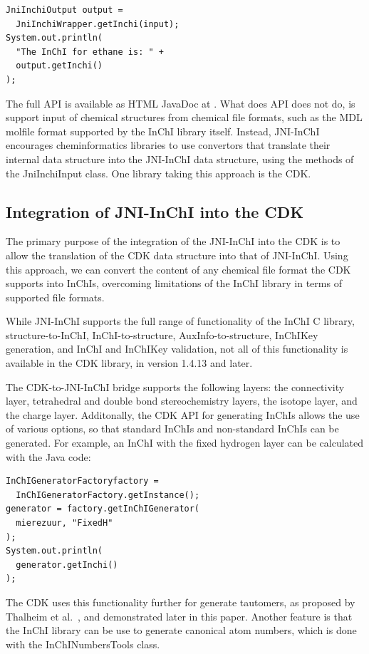 \documentclass[10pt]{bmc_article}
\newenvironment{bmcformat}{\fussy\setboolean{publ}{true}}{\fussy}
\begin{document}
\begin{bmcformat}
\begin{verbatim}
JniInchiOutput output =
  JniInchiWrapper.getInchi(input);
System.out.println(
  "The InChI for ethane is: " +
  output.getInchi()
);
\end{verbatim}

The full API is available as HTML JavaDoc at \url{}. What does API does not do, is support input of chemical
structures from chemical file formats, such as the MDL molfile format supported by the InChI library itself.
Instead, JNI-InChI encourages cheminformatics libraries to use convertors that translate their internal
data structure into the JNI-InChI data structure, using the methods of the JniInchiInput class.
One library taking this approach is the CDK.

\subsection*{Integration of JNI-InChI into the CDK}

The primary purpose of the integration of the JNI-InChI into the CDK is to allow the translation of the
CDK data structure into that of JNI-InChI. Using this approach, we can convert the content of any chemical
file format the CDK supports into InChIs, overcoming limitations of the InChI library in terms of supported
file formats.

While JNI-InChI supports the full range of functionality of the InChI C library, structure-to-InChI, InChI-to-structure,
AuxInfo-to-structure, InChIKey generation, and InChI and InChIKey validation, not all of this functionality is available in the
CDK library, in version 1.4.13 and later.

The CDK-to-JNI-InChI bridge supports the following layers: the connectivity layer, tetrahedral and double bond stereochemistry layers, the isotope layer, and the charge layer. Additonally, the CDK API for generating InChIs allows the
use of various options, so that standard InChIs and non-standard InChIs can be generated. For example,
an InChI with the fixed hydrogen layer can be calculated with the Java code:

\begin{verbatim}
InChIGeneratorFactoryfactory =
  InChIGeneratorFactory.getInstance();
generator = factory.getInChIGenerator(
  mierezuur, "FixedH"
);
System.out.println(
  generator.getInchi()
);
\end{verbatim}

The CDK uses this functionality further for generate tautomers, as proposed by Thalheim et al.~\cite{Thalheim2010},
and demonstrated later in this paper. Another feature is that the InChI library can be use to generate canonical
atom numbers, which is done with the InChINumbersTools class.


\end{bmcformat}
\end{document}

